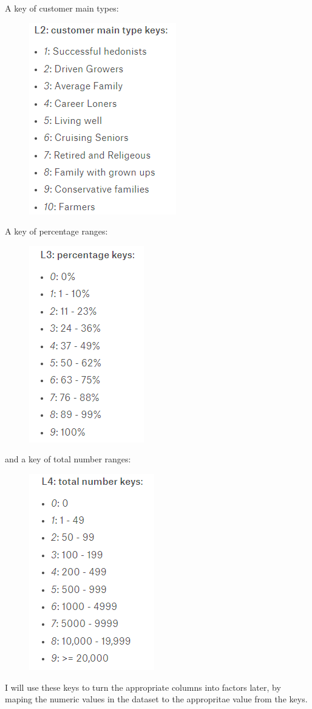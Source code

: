 \documentclass{article}\usepackage[]{graphicx}\usepackage[]{color}
\begin{document}
A key of customer main types:
\begin{figure}[H]
\includegraphics{images/customermaintype.png}
\end{figure}
A key of percentage ranges:
\begin{figure}[H]
\includegraphics{images/percentage.png}
\end{figure}
and a key of total number ranges:
\begin{figure}[H]
\includegraphics{images/totalnumber.png}
\end{figure}
I will use these keys to turn the appropriate columns into factors later, by maping the numeric values in the dataset to the appropritae value from the keys. 
\end{document}
